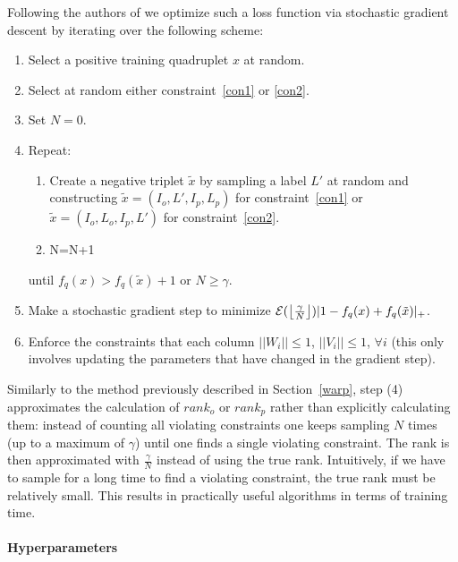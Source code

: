 Following the authors of \citep{wsabie} we optimize such a loss function via 
stochastic gradient descent by iterating over the following scheme:
\begin{enumerate}
\item Select a positive training quadruplet $x$ at random.
\item Select at random either constraint~\eqref{con1} or \eqref{con2}.
\item Set $N=0$.
\item Repeat:
{
  \begin{enumerate}
  \item Create a negative triplet $\tilde{x}$ by sampling a label $L'$ at random 
and constructing  $\tilde{x} = (I_o,L',I_p,L_p)$ for constraint~\eqref{con1}  
or $\tilde{x} = (I_o,L_o,I_p,L')$ for constraint~\eqref{con2}.
  \item N=N+1
  \end{enumerate}
}
until $f_q(x) > f_q(\tilde{x}) + 1$ or $N \geq \gamma$.
\item Make a stochastic gradient step to minimize
  ${\cal E}(\left \lfloor \frac{\gamma}{N} \right \rfloor) |1-f_q(x)+f_q(\tilde{x})|_{+} $.
\item Enforce the constraints that each column $||W_i|| \leq 1$, $||V_i|| \leq 1$, $\forall i$ (this only involves updating the parameters that have changed in the gradient step).
\end{enumerate}


Similarly to the method previously described in Section~\ref{warp}, 
step (4) approximates the calculation of
$rank_o$ or $rank_p$ rather than explicitly calculating them: instead of counting
all violating constraints one keeps sampling $N$ times (up to a maximum of $\gamma$) 
until one finds a single violating constraint.
The rank is then approximated with  $\frac{\gamma}{N}$ instead of using the true rank. 
Intuitively, if we have to sample for a long time to
find a violating constraint, the true rank must be relatively small.
This results in practically useful algorithms in terms of training time.

\paragraph{Hyperparameters}

